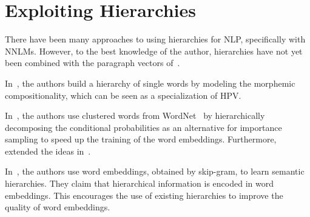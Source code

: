 \section{Exploiting Hierarchies}

There have been many approaches to using hierarchies for NLP, specifically with NNLMs. However, to the best knowledge of the author, hierarchies have not yet been combined with the paragraph vectors of~\cite{Le2014}.

In~\cite{Luong2013}, the authors build a hierarchy of single words by modeling the morphemic compositionality, which can be seen as a specialization of HPV\@.

In~\cite{Morin2005}, the authors use clustered words from WordNet~\cite{Fellbaum1998} by hierarchically decomposing the conditional probabilities as an alternative for importance sampling to speed up the training of the word embeddings. Furthermore,~\cite{Mnih2009} extended the ideas in~\cite{Morin2005}.

In~\cite{Fu2014}, the authors use word embeddings, obtained by skip-gram, to learn semantic hierarchies. They claim that hierarchical information is encoded in word embeddings. This encourages the use of existing hierarchies to improve the quality of word embeddings.



